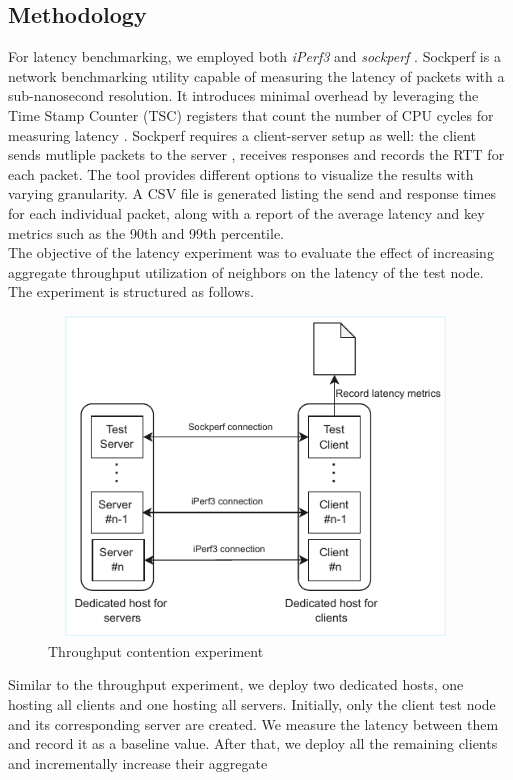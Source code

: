 \subsection{Methodology}
For latency benchmarking, we employed both \textit{iPerf3} and \textit{sockperf} \cite{sockperf}. 
Sockperf is a network benchmarking utility capable of measuring the latency of packets with a 
sub-nanosecond resolution. It introduces minimal overhead by leveraging the Time Stamp Counter (TSC) 
registers that count the number of CPU cycles for measuring latency \cite{sockperf}. 
Sockperf requires a client-server setup as well: the client sends mutliple packets to the server
, receives responses and records the \ac{RTT} for each packet. 
The tool provides different options to visualize the results with varying granularity. 
A CSV file is generated listing the send and response times for each individual packet,
along with a report of the average latency and key metrics such as the 90th and 99th percentile. \\
The objective of the latency experiment was to evaluate the effect of increasing aggregate throughput 
utilization of neighbors on the latency of the test node. The experiment is structured as 
follows.
\begin{figure}[H]
  \centering
  \includegraphics[width=11cm, height=8.5cm]{figures/latexp}
  \caption{Throughput contention experiment}
  \label{fig:latexp}
\end{figure}
\noindent
Similar to the throughput experiment, we deploy two dedicated hosts, 
one hosting all clients and one hosting all servers. Initially, only the client test node 
and its corresponding server are created. We measure the latency between them and record it as a baseline 
value. After that, we deploy all the remaining clients and incrementally increase their aggregate 

